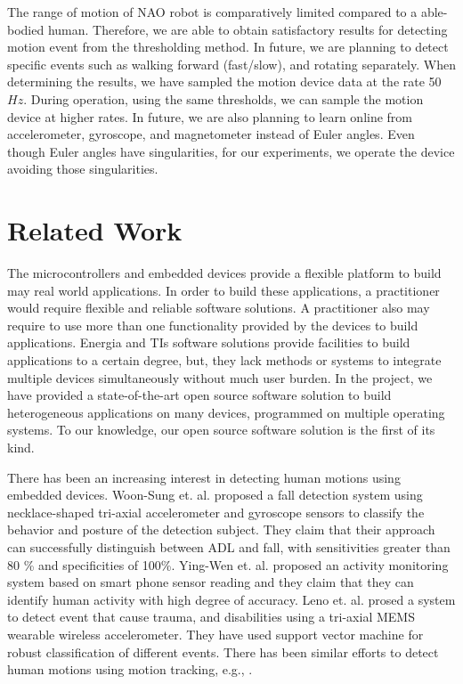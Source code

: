 \documentclass[letterpaper]{article}
\begin{document}
The range of motion of NAO robot is comparatively limited compared to a able-bodied human.
Therefore, we are able to obtain satisfactory results for detecting motion event from the
thresholding method. In future, we are planning to detect specific events such as walking forward
(fast/slow), and rotating separately. When determining the results, we have sampled the motion
device data at the rate 50$Hz$. During operation, using the same thresholds, we can sample the
motion device at higher rates. In future, we are also planning to learn online from accelerometer,
gyroscope, and magnetometer instead of Euler angles. Even though Euler angles have singularities,
for our experiments, we operate the device avoiding those singularities.  


\section{Related Work}

The microcontrollers and embedded devices provide a flexible platform to build may real world
applications. In order to build these applications, a practitioner would require  flexible and
reliable software solutions. A practitioner also may require to use more than one functionality
provided by the devices to build applications. Energia and TIs software solutions provide
facilities to build applications to a certain degree, but, they lack methods or systems to integrate
multiple devices simultaneously without much user burden. In the project, we have provided a
state-of-the-art open source software solution to build heterogeneous applications on many devices,
programmed on multiple operating systems. To our knowledge, our open source software solution is the
first of its kind. 

There has been an increasing interest in detecting human motions using embedded devices. Woon-Sung
et. al. \cite{baek2013real} proposed  a fall  detection  system  using necklace-shaped tri-axial
accelerometer  and  gyroscope  sensors  to  classify  the  behavior  and  posture  of  the detection
 subject. They claim that their  approach  can  successfully  distinguish between  ADL and  fall, 
with  sensitivities  greater  than  80 \%  and specificities  of  100\%. Ying-Wen et. al.
\cite{bai2013recognition} proposed an activity monitoring system based on smart phone sensor
reading and they claim that they can identify human activity with high degree of accuracy. Leno et.
al. \cite{leone2013supervised} prosed a system to detect event that cause trauma, and disabilities
using a tri-axial MEMS wearable wireless accelerometer. They have used support vector machine for
robust classification of different events. There has been similar efforts to detect human motions
using motion tracking, e.g., \cite{dumitrache2013fall,kumarwearable,liang2012pre}.
\end{document}
